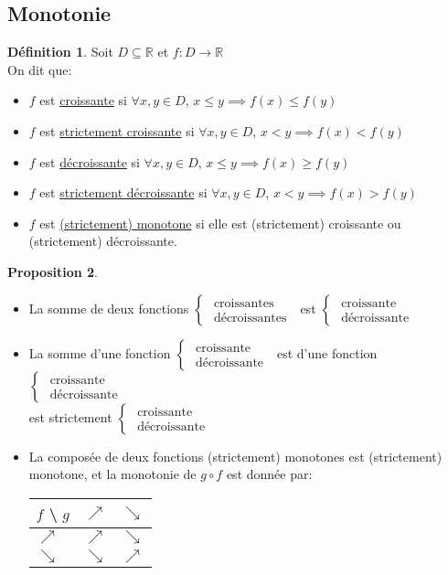 \documentclass[10pt,a4paper]{article}
\theoremstyle{definition}
\newtheorem{proposition}{Proposition}[section]
\newtheorem{definition}[proposition]{Définition}
\begin{document}
\subsection{Monotonie}
\begin{definition}
Soit $D \subseteq \mathbb{R}$ et $f: D \to \mathbb{R}$ \\
On dit que:
\begin{itemize}
\item $f$ est \uline{croissante} si $\forall x, y \in D$, $x \leq y \implies f(x) \leq f(y)$
\item $f$ est \uline{strictement croissante} si $\forall x, y \in D$, $x < y \implies f(x) < f(y)$
\item $f$ est \uline{décroissante} si $\forall x, y \in D$, $x \leq y \implies f(x) \geq f(y)$
\item $f$ est \uline{strictement décroissante} si $\forall x, y \in D$, $x < y \implies f(x) > f(y)$
\item $f$ est \uline{(strictement) monotone} si elle est (strictement) croissante ou (strictement) décroissante.
\end{itemize}
\end{definition}
\begin{proposition}
\hfill
\begin{itemize}
\item La somme de deux fonctions $\begin{cases}
\text{ croissantes } \\
\text{ décroissantes }
\end{cases}$ est $\begin{cases}
\text{ croissante } \\
\text{ décroissante }
\end{cases}$
\item La somme d'une fonction $\begin{cases}
\text{ croissante } \\
\text{ décroissante }
\end{cases}$ est d'une fonction $\begin{cases}
\text{ croissante } \\
\text{ décroissante }
\end{cases}$ \\ 
est strictement $\begin{cases}
\text{ croissante } \\
\text{ décroissante }
\end{cases}$
\item La composée de deux fonctions (strictement) monotones est (strictement) monotone, et la monotonie de $g \circ f$ est donnée par:
\begin{center}
\begin{tabular}{M{3em} | M{3em} | M{3em}}
$f$ \textbackslash  $\,\,g$ & $\nearrow$ & $\searrow$ \\
\hline
$\nearrow$ & $\nearrow$ & $\searrow$ \\
\hline
$\searrow$ & $\searrow$ & $\nearrow$
\end{tabular}
\end{center}
\end{itemize}
\end{proposition}
\end{document}
